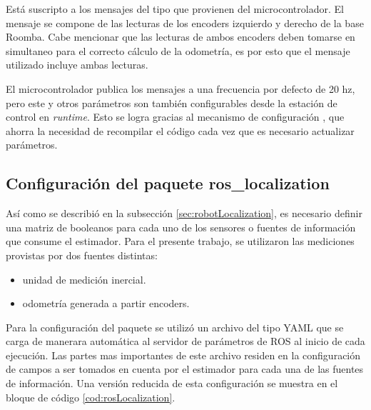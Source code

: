 Está suscripto a los mensajes del tipo  que provienen del microcontrolador. El mensaje se compone de las lecturas de los encoders izquierdo y derecho de la base Roomba. Cabe mencionar que las lecturas de ambos encoders deben tomarse en simultaneo para el correcto cálculo de la odometría, es por esto que el mensaje utilizado incluye ambas lecturas.

El microcontrolador publica los mensajes a una frecuencia por defecto de 20 hz, pero este y otros parámetros son también configurables desde la estación de control en \textit{runtime}. Esto se logra gracias al mecanismo de configuración , que ahorra la necesidad de recompilar el código cada vez que es necesario actualizar parámetros.

\subsection{Configuración del paquete ros\_localization}

Así como se describió en la subsección \ref{sec:robotLocalization}, es necesario definir una matriz de booleanos para cada uno de los sensores o fuentes de información que consume el estimador. Para el presente trabajo, se utilizaron las mediciones provistas por dos fuentes distintas:

\begin{itemize}
  \item unidad de medición inercial.
  \item odometría generada a partir encoders.
\end{itemize}

Para la configuración del paquete se utilizó un archivo del tipo YAML que se carga de manerara automática al servidor de parámetros de ROS al inicio de cada ejecución. Las partes mas importantes de este archivo residen en la configuración de campos a ser tomados en cuenta por el estimador para cada una de las fuentes de información. Una versión reducida de esta configuración se muestra en el bloque de código \ref{cod:rosLocalization}.

\newpage

\newcommand\YAMLcolonstyle{\color{green}\mdseries}
\newcommand\YAMLkeystyle{\color{black}\bfseries}
\newcommand\YAMLvaluestyle{\color{blue}\mdseries}

\makeatletter

\newcommand\language@yaml{yaml}

